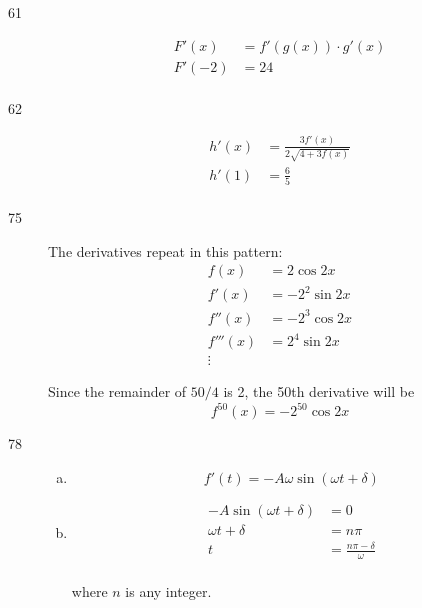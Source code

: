 \documentclass[letterpaper, landscape]{exam}
\begin{document}
\begin{description}
    \item[61] 
      \begin{align*}
        F'(x)  & = f'(g(x)) \cdot g'(x) \\
        F'(-2) & = \boxed{ 24 } \\
      \end{align*}

    \item[62] 
      \begin{align*}
        h'(x) &= \frac{3 f'(x)}{2 \sqrt{4 + 3 f(x)}} \\
        h'(1) &= \boxed{ \frac{6}{5} } \\
      \end{align*}

    \item[75]
      The derivatives repeat in this pattern:
      \begin{align*}
        f(x)     & = 2 \cos 2x \\
        f'(x)    & = - 2^2 \sin 2x \\
        f''(x)   & = - 2^3 \cos 2x \\
        f'''(x)  & = 2^4 \sin 2x \\
        \vdots
      \end{align*}

      Since the remainder of $50/4$ is 2, the 50th derivative will be 
      \[
        \boxed{ f^{50}(x) = - 2^{50} \cos 2x }
      \]

    \item[78] 
      \begin{enumerate}[(a)]
        \item 
          \[
            f'(t) = \boxed{ -A \omega \sin(\omega t + \delta) }
          \]

        \item 
          \begin{align*}
            -A \sin(\omega t + \delta) & = 0 \\
            \omega t + \delta          & = n \pi \\
            t                          & = \boxed{ \frac{n \pi - \delta}{\omega} } \\
          \end{align*}

          where $n$ is any integer.

      \end{enumerate}


\end{description}
\end{document}
